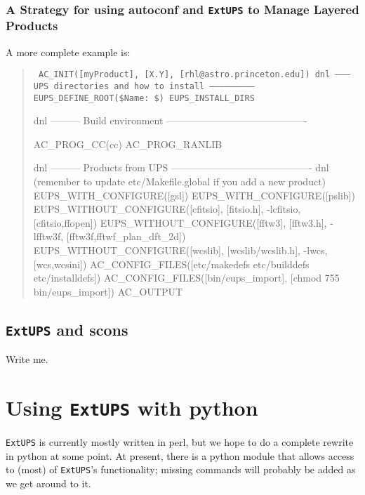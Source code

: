\documentclass{article}
\newcommand{\code}[1]{\texttt{#1}}
\newcommand{\eups}{\code{ExtUPS}}
\begin{document}
\subsubsection{A Strategy for using autoconf and \eups{} to Manage Layered Products}


A more complete example is:

\begin{quote}
    \obeylines\tt\small\parskip=0pt
AC\_INIT([myProduct], [X.Y], [rhl@astro.princeton.edu])
\vspace{5pt}
dnl --------- UPS directories and how to install --------------------------
\vspace{5pt}
EUPS\_DEFINE\_ROOT(\${Name}:  \$)
EUPS\_INSTALL\_DIRS   
\vspace{5pt}

dnl --------- Build environment -------------------------------------------

AC\_PROG\_CC(cc)
AC\_PROG\_RANLIB

dnl --------- Products from UPS -------------------------------------------
dnl (remember to update etc/Makefile.global if you add a new product)
\vspace{5pt}
EUPS\_WITH\_CONFIGURE([gsl])
EUPS\_WITH\_CONFIGURE([pslib])
\vspace{5pt}
EUPS\_WITHOUT\_CONFIGURE([cfitsio], [fitsio.h],
                        -lcfitsio, [cfitsio,ffopen])
EUPS\_WITHOUT\_CONFIGURE([fftw3],   [fftw3.h],
                        -lfftw3f,  [fftw3f,fftwf\_plan\_dft\_2d])
EUPS\_WITHOUT\_CONFIGURE([wcslib],  [wcslib/wcslib.h],
                        -lwcs,     [wcs,wcsini])
\vspace{5pt}
AC\_CONFIG\_FILES([etc/makedefs etc/builddefs etc/installdefs])
AC\_CONFIG\_FILES([bin/eups\_import], [chmod 755 bin/eups\_import])
\vspace{5pt}
AC\_OUTPUT
\end{quote}

\subsection{\eups{} and scons}
\label{scons}

Write me.

\section{Using \eups{} with python}

\eups{} is currently mostly written in perl, but we hope to do a
complete rewrite in python at some point.  At present, there is a
python module that allows access to (most) of \eups's functionality;
missing commands will probably be added as we get around to it.
\end{document}
